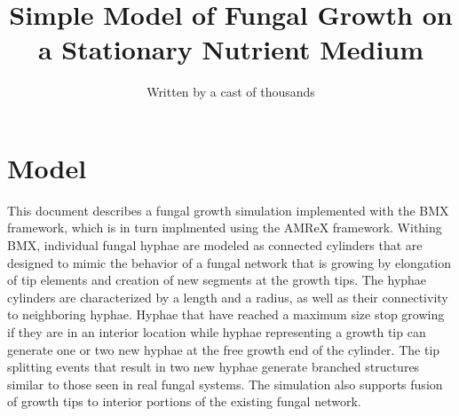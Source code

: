\documentclass[12pt]{article}
\begin{document}
\newcommand{\dt}{\Delta t}
\newcommand{\Fvec}{\overline{F}}
\newcommand{\fvec}{\overline{f}}
\newcommand{\rvec}{\overline{r}}
\newcommand{\omvec}{\overline{\omega}}
\newcommand{\xvec}{\overline{x}}
\newcommand{\Xvec}{\overline{X}}
\newcommand{\yvec}{\overline{y}}
\newcommand{\Yvec}{\overline{Y}}
\newcommand{\Vvec}{\overline{V}}
\newcommand{\Rvec}{\overline{R}}
\newcommand{\Gvec}{\overline{G}}
\newcommand{\svec}{\overline{s}}
\newcommand{\Tvec}{\overline{T}}
\newcommand{\Lvec}{\overline{L}}
\newcommand{\vvec}{\overline{v}}
\newcommand{\nhat}{\hat{n}}
\newcommand{\rhvec}{\overline{\rho}}
\newcommand{\Dmat}{\overline{\overline{D}}}
\newcommand{\Rmat}{\overline{\overline{R}}}
\newcommand{\Omat}{\overline{\overline{1}}}
\newcommand{\Imat}{\overline{\overline{I}}}
\newcommand{\Hmat}{\overline{\overline{H}}}
\newcommand{\Lag}{\mathcal{L}}
\title{Simple Model of Fungal Growth on a Stationary Nutrient Medium}
\author{Written by a cast of thousands}
\maketitle

\renewcommand{\thetable}{\Roman{table}}

\section{Model}
This document describes a fungal growth simulation implemented with the
BMX framework, which is in turn implmented using the AMReX framework.
Withing BMX, individual fungal hyphae are modeled as connected cylinders that 
are designed to mimic the behavior of a fungal network that is growing by
elongation of tip elements and creation of new segments at the growth tips.
The hyphae cylinders are characterized by a length and a radius, as well as
their connectivity to neighboring hyphae. Hyphae
that have reached a maximum size stop growing if they are in an interior
location while hyphae representing a growth tip can generate one or two new
hyphae at the free growth end of the cylinder. The tip splitting events that
result in two new hyphae generate branched structures similar to those
seen in real fungal systems. The simulation also supports fusion of growth
tips to interior portions of the existing fungal network.
\end{document}
